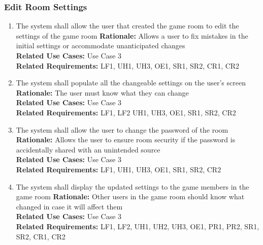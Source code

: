 \documentclass[12pt]{article}
\begin{document}
\subsubsection{Edit Room Settings}
\begin{enumerate}[label=RS\arabic*., series=EditRoom]
	\item The system shall allow the user that created the game room to edit the settings of the game room\newline 
    \textbf{Rationale:} Allows a user to fix mistakes in the initial settings or accommodate unanticipated changes\\
    \textbf{Related Use Cases:} Use Case 3\\
    \textbf{Related Requirements:} LF1, UH1, UH3, OE1, SR1, SR2, CR1, CR2
    \item The system shall populate all the changeable settings on the user's screen\newline 
    \textbf{Rationale:} The user must know what they can change\\
    \textbf{Related Use Cases:} Use Case 3\\
    \textbf{Related Requirements:} LF1, LF2 UH1, UH3, OE1, SR1, SR2, CR2
    \item The system shall allow the user to change the password of the room\newline 
    \textbf{Rationale:} Allows the user to ensure room security if the password is accidentally shared with an unintended source\\
    \textbf{Related Use Cases:} Use Case 3\\
    \textbf{Related Requirements:} LF1, UH1, UH3, OE1, SR1, SR2, CR2
    \item The system shall display the updated settings to the game members in the game room\newline 
    \textbf{Rationale:} Other users in the game room should know what changed in case it will affect them\\
    \textbf{Related Use Cases:} Use Case 3\\
    \textbf{Related Requirements:} LF1, LF2, UH1, UH2, UH3, OE1, PR1, PR2, SR1, SR2, CR1, CR2
\end{enumerate}
\end{document}
